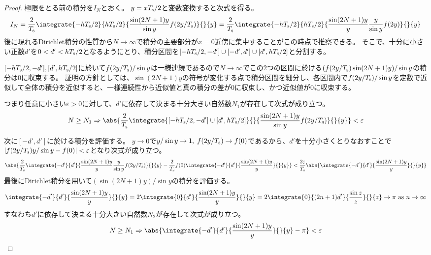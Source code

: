         \begin{proof}
            \quad\par
            極限をとる前の積分を$I_N$とおく。
            $y = x T_\text{s}/2$と変数変換すると次式を得る。
            \[
                I_N = \frac{2}{\Tsamp}\integrate{-h \Tsamp/2}{h \Tsamp/2}{\frac{\sin(2N+1)y}{\sin y}f(2y/\Tsamp)}{}{y} = \frac{2}{\Tsamp}\integrate{-h \Tsamp/2}{h \Tsamp/2}{\frac{\sin(2N+1)y}{y}\frac{y}{\sin y}f(2y)}{}{y}
            \]
            後に現れるDirichlet積分の性質から$N\to\infty$で積分の主要部分が$x=0$近傍に集中することがこの時点で推察できる。
            そこで、十分に小さい正数$d'$を$0<d'<h T_\text{s}/2$となるようにとり、積分区間を$[-h T_\text{s}/2,-d']\cup[-d',d']\cup[d',h T_\text{s}/2]$と分割する。
            \par
            $[-h T_\text{s}/2,-d'], [d',h T_\text{s}/2]$に於いて$f(2y/T_\text{s})/\sin y$は一様連続であるので$N\to\infty$でこの2つの区間に於ける$(f(2y/T_\text{s})\sin(2N+1)y)/\sin y$の積分は0に収束する。
            証明の方針としては、$\sin(2N+1)y$の符号が変化する点で積分区間を細分し、各区間内で$f(2y/T_\text{s})/\sin y$を定数で近似して全体の積分を近似すると、一様連続性から近似値と真の積分の差が0に収束し、かつ近似値が0に収束する。
            \par
            つまり任意に小さい$\varepsilon>0$に対して、$d'$に依存して決まる十分大きい自然数$N_1$が存在して次式が成り立つ。
            \[
                N\geq N_1 \Rightarrow \abs{\frac{2}{\Tsamp}\integrate{[-h \Tsamp/2,-d']\cup[d',h \Tsamp/2]}{}{\frac{\sin(2N+1)y}{\sin y}f(2y/\Tsamp)}{}{y}}<\varepsilon
            \]
            \par
            次に$[-d',d']$に於ける積分を評価する。
            $y\to 0$で$y/\sin y\to 1,\;f(2y/T_\text{s})\to f(0)$であるから、$d'$を十分小さくとりなおすことで$|f(2y/T_\text{s})y/\sin y - f(0)| < \varepsilon$となり次式が成り立つ。
            \[
                \abs{\frac{2}{\Tsamp}\integrate{-d'}{d'}{\frac{\sin(2N+1)y}{y}\frac{y}{\sin y}f(2y/\Tsamp)}{}{y} - \frac{2}{\Tsamp}f(0)\integrate{-d'}{d'}{\frac{\sin(2N+1)y}{y}}{}{y}} < \frac{2\varepsilon}{\Tsamp}\abs{\integrate{-d'}{d'}{\frac{\sin(2N+1)y}{y}}{}{y}}
            \]
            最後にDirichlet積分を用いて$(\sin(2N+1)y)/\sin y$の積分を評価する。
            \[
                \integrate{-d'}{d'}{\frac{\sin(2N+1)y}{y}}{}{y} = 2\integrate{0}{d'}{\frac{\sin(2N+1)y}{y}}{}{y} = 2\integrate{0}{(2n+1)d'}{\frac{\sin z}{z}}{}{z} \to \pi \text{ as } n\to\infty
            \]
            すなわち$d'$に依存して決まる十分大きい自然数$N_2$が存在して次式が成り立つ。
            \[ N\geq N_1 \Rightarrow \abs{\integrate{-d'}{d'}{\frac{\sin(2N+1)y}{y}}{}{y} - \pi} < \varepsilon \]

\end{proof}
